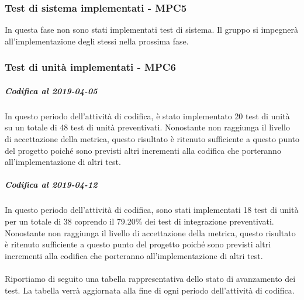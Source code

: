 \subsubsection{Test di sistema implementati - MPC5}
In questa fase non sono stati implementati test di sistema.
Il gruppo si impegnerà all'implementazione degli stessi nella prossima fase.

\subsubsection{Test di unità implementati - MPC6}
\subparagraph{Codifica al 2019-04-05}
In questo periodo dell'attività di codifica, è stato implementato 20 test di unità su un totale di 48 test di unità preventivati.
Nonostante non raggiunga il livello di accettazione della
metrica, questo risultato è ritenuto sufficiente a questo punto del progetto poiché sono previsti altri incrementi alla codifica che porteranno all'implementazione di altri test.

\subparagraph{Codifica al 2019-04-12}
In questo periodo dell'attività di codifica, sono stati implementati 18 test di unità per un totale di 38 coprendo il 79.20\% dei test di integrazione preventivati.
Nonostante non raggiunga il livello di accettazione della
metrica, questo risultato è ritenuto sufficiente a questo punto del progetto poiché sono previsti altri incrementi alla codifica che porteranno all'implementazione di altri test.\\
\\
Riportiamo di seguito una tabella rappresentativa dello stato di avanzamento dei test. La tabella verrà aggiornata alla fine di ogni periodo dell'attività di codifica.

